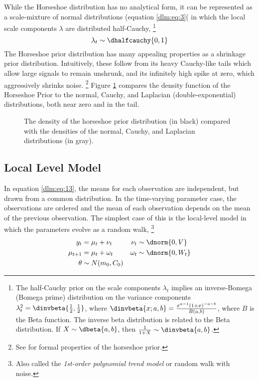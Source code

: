 While the Horseshoe distribution has no analytical form, it can be represented as a scale-mixture of normal distributions (equation \eqref{dlm:eq:3}( in which the local scale components $\lambda$ are distributed half-Cauchy,%
\footnote{
The half-Cauchy prior on the scale components $\lambda_{t}$ implies an inverse-Bomega (Bomega prime) distribution on the variance components $\lambda_{t}^{2} = \dinvbeta{\frac{1}{2}, \frac{1}{2}}$, where $\dinvbeta{x; a, b} = \frac{x^{a - 1} (1 + x)^{-a - b}}{B(a, b)}$, where $B$ is the Beta function.
The inverse beta distribution is related to the Beta distribution.
If $X \sim \dbeta{a, b}$, then $\frac{1}{1 + X} \sim \dinvbeta{a, b}$.
}
\begin{equation}
  \label{dlm:eq:6}
  \lambda_{t} \sim \dhalfcauchy{0, 1}
\end{equation}
The Horseshoe prior distribution has many appealing properties as a shrinkage prior distribution.
Intuitively, these follow from its heavy Cauchy-like tails which allow large signals to remain unshrunk, and its infinitely high spike at zero, which aggressively shrinks noise.
\footnote{See \textcites{CarvalhoPolsonScott2010}{CarvalhoPolsonScott2009}{DattaGhosh2012} for formal properties of the horseshoe prior.}
Figure \ref{dlm:fig:horseshoe} compares the density function of the Horseshoe Prior to the normal, Cauchy, and Laplacian (double-exponential) distributions, both near zero and in the tail.
\begin{figure}
  \centering
  \caption{The density of the horseshoe prior distribution (in black) compared with the densities of the normal, Cauchy, and Laplacian distributions (in gray).}
  \label{dlm:fig:horseshoe}
\end{figure}

\subsection{Local Level Model}
\label{dlm:sec:local-level-model}

In equation \ref{dlm:eq:13}, the means for each observation are independent, but drawn from a common distribution.
In the time-varying parameter case, the observations are ordered and the mean of each observation depends on the mean of the previous observation.
The simplest case of this is the local-level model in which the parameters evolve as a random walk,
\footnote{Also called the \textit{1st-order polynomial trend model} \parencite[Chapter 2]{WestHarrison1997} or random walk with noise.}
\begin{equation}
  \label{dlm:eq:5}
  \begin{aligned}[t]
    y_{t} &= \mu_{t} + \nu_{t} & \nu_{t} & \sim \dnorm{0, V} \\
    \mu_{t + 1} &= \mu_{t} + \omega_{t} & \omega_{t} & \sim \dnorm{0, W_{t}} \\
    \theta & \sim N(m_{0}, C_{0})
  \end{aligned}
\end{equation}

